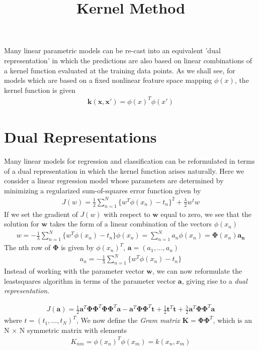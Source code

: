 \documentclass[a4paper]{article}
\begin{document}
\title{Kernel Method}
\author{}
\maketitle

Many linear parametric models can be re-cast into an equivalent
 'dual representation' in which the predictions are also based on linear
 combinations of a kernel function evaluated at the training data points.
As we shall see, for models which are based on a fixed nonlinear feature
 space mapping $\phi(x)$, the kernel function is given
\begin{align}
\mathbf{k}(\mathbf{x}, \mathbf{x'}) = \phi(x)^T\phi(x')
\end{align}

\section{Dual Representations}
Many linear models for regression and classification can be reformulated in terms of
 a dual representation in which the kernel function arises naturally.
Here we consider a linear regression model whose parameters are determined by
minimizing a regularized sum-of-squares error function given by
\begin{align}
J(w) = \frac{1}{2} \sum_{n=1}^{N} \{ w^T\phi(x_n) -t_n \}^2 + \frac{\lambda}{2}w^tw
\end{align}
If we set the gradient of $J(w)$ with respect to $\mathbf{w}$ equal to zero,
 we see that the solution for $\mathbf{w}$ takes the form of a linear
 combination of the vectors $\phi(x_n)$
\begin{align}
w = -\frac{1}{\lambda} \sum_{n=1}^{N} \{ w^T\phi(x_n) -t_n \}\phi(x_n)
  = \sum_{n=1}^Na_n\phi(x_n) = \mathbf{\Phi}(x_n)\mathbf{a_n}
\end{align}
The nth row of $\mathbf{\Phi}$ is given by $\phi(x_n)^T$, $\mathbf{a}
= (a_1,...,a_n)$
\begin{align}
a_n = -\frac{1}{\lambda} \sum_{n=1}^{N} \{ w^T\phi(x_n) -t_n \}
\end{align}
Instead of working with the parameter vector $\mathbf{w}$, we can now
 reformulate the leastsquares algorithm in terms of the parameter vector
 $\mathbf{a}$, giving rise to a \textit{dual representation}.

\begin{align}
J(\mathbf{a}) = \frac{1}{2} \mathbf{a}^T \mathbf{\Phi} \mathbf{\Phi}^T
  \mathbf{\Phi} \mathbf{\Phi}^T \mathbf{a} - \mathbf{a}^T
  \mathbf{\Phi} \mathbf{\Phi}^T \mathbf{t} + \frac{1}{2} \mathbf{t}^T
  \mathbf{t} + \frac{\lambda}{2} \mathbf{a}^T \mathbf{\Phi}
  \mathbf{\Phi}^T \mathbf{a}
\end{align}
where $t = (t_1,...,t_N)^T$, We now define the \textit{Gram matrix}
$\mathbf{K} = \mathbf{\Phi} \mathbf{\Phi}^T$, which is an N × N symmetric matrix with elements
\begin{align}
\mathit{K}_{nm} = \phi(x_n)^T\phi(x_m) = k(x_n, x_m)
\end{align}
\end{document}
